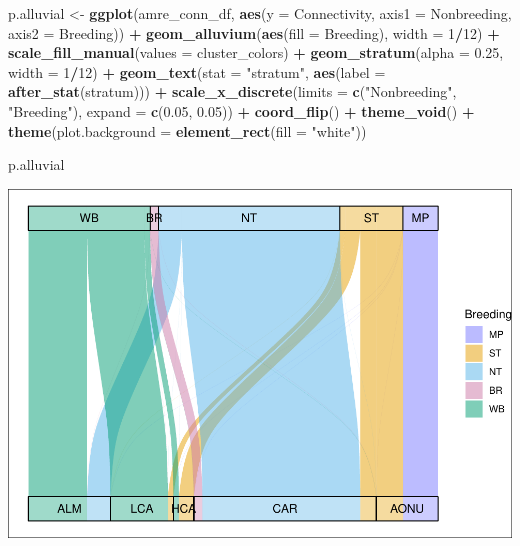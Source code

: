 \documentclass[
]{book}
\newenvironment{Shaded}{\begin{snugshade}}{\end{snugshade}}
\newcommand{\AttributeTok}[1]{\textcolor[rgb]{0.13,0.29,0.53}{#1}}
\newcommand{\DecValTok}[1]{\textcolor[rgb]{0.00,0.00,0.81}{#1}}
\newcommand{\FloatTok}[1]{\textcolor[rgb]{0.00,0.00,0.81}{#1}}
\newcommand{\FunctionTok}[1]{\textcolor[rgb]{0.13,0.29,0.53}{\textbf{#1}}}
\newcommand{\NormalTok}[1]{#1}
\newcommand{\OtherTok}[1]{\textcolor[rgb]{0.56,0.35,0.01}{#1}}
\newcommand{\SpecialCharTok}[1]{\textcolor[rgb]{0.81,0.36,0.00}{\textbf{#1}}}
\newcommand{\StringTok}[1]{\textcolor[rgb]{0.31,0.60,0.02}{#1}}
\begin{document}
\begin{Shaded}
\begin{Highlighting}[]
\NormalTok{p.alluvial }\OtherTok{\textless{}{-}} \FunctionTok{ggplot}\NormalTok{(amre\_conn\_df,}
       \FunctionTok{aes}\NormalTok{(}\AttributeTok{y =}\NormalTok{ Connectivity, }\AttributeTok{axis1 =}\NormalTok{ Nonbreeding, }\AttributeTok{axis2 =}\NormalTok{ Breeding)) }\SpecialCharTok{+}
  \FunctionTok{geom\_alluvium}\NormalTok{(}\FunctionTok{aes}\NormalTok{(}\AttributeTok{fill =}\NormalTok{ Breeding), }\AttributeTok{width =} \DecValTok{1}\SpecialCharTok{/}\DecValTok{12}\NormalTok{) }\SpecialCharTok{+}
  \FunctionTok{scale\_fill\_manual}\NormalTok{(}\AttributeTok{values =}\NormalTok{ cluster\_colors) }\SpecialCharTok{+}
  \FunctionTok{geom\_stratum}\NormalTok{(}\AttributeTok{alpha =} \FloatTok{0.25}\NormalTok{, }\AttributeTok{width =} \DecValTok{1}\SpecialCharTok{/}\DecValTok{12}\NormalTok{) }\SpecialCharTok{+}
  \FunctionTok{geom\_text}\NormalTok{(}\AttributeTok{stat =} \StringTok{"stratum"}\NormalTok{, }\FunctionTok{aes}\NormalTok{(}\AttributeTok{label =} \FunctionTok{after\_stat}\NormalTok{(stratum))) }\SpecialCharTok{+}
  \FunctionTok{scale\_x\_discrete}\NormalTok{(}\AttributeTok{limits =} \FunctionTok{c}\NormalTok{(}\StringTok{"Nonbreeding"}\NormalTok{, }\StringTok{"Breeding"}\NormalTok{),}
                   \AttributeTok{expand =} \FunctionTok{c}\NormalTok{(}\FloatTok{0.05}\NormalTok{, }\FloatTok{0.05}\NormalTok{)) }\SpecialCharTok{+} 
  \FunctionTok{coord\_flip}\NormalTok{() }\SpecialCharTok{+}
  \FunctionTok{theme\_void}\NormalTok{() }\SpecialCharTok{+}
  \FunctionTok{theme}\NormalTok{(}\AttributeTok{plot.background =} \FunctionTok{element\_rect}\NormalTok{(}\AttributeTok{fill =} \StringTok{"white"}\NormalTok{))}

\NormalTok{p.alluvial}
\end{Highlighting}
\end{Shaded}

\includegraphics{Mignette_files/figure-latex/unnamed-chunk-25-1.pdf}
\end{document}
